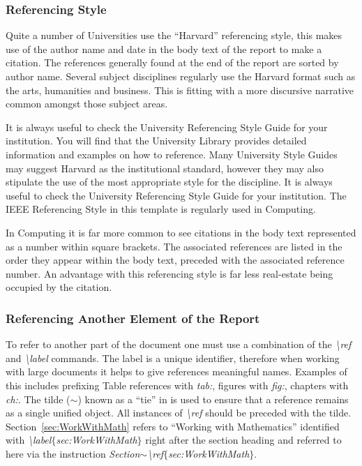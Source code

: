 \subsubsection{Referencing Style}
Quite a number of Universities use the ``Harvard'' referencing style, this makes use of the author name and date in the body text of the report to make a citation. The references generally found at the end of the report are sorted by author name. Several subject disciplines regularly use the Harvard format such as the arts, humanities and business. This is fitting with a more discursive narrative common amongst those subject areas. 

It is always useful to check the University Referencing Style Guide for your institution. You will find that the University Library provides detailed information and examples on how to reference. Many University Style Guides may suggest Harvard as the institutional standard, however they may also stipulate the use of the most appropriate style for the discipline. It is always useful to check the University Referencing Style Guide for your institution. The IEEE Referencing Style in this template is regularly used in Computing.      

In Computing it is far more common to see citations in the body text represented as a number within square brackets. The associated references are listed in the order they appear within the body text, preceded with the associated reference number. An advantage with this referencing style is far less real-estate being occupied by the citation. 

\subsubsection{Referencing Another Element of the Report}
To refer to another part of the document one must use a combination of the \emph{\textbackslash ref} and \emph{\textbackslash label} commands. The label is a unique identifier, therefore when working with large documents it helps to give references meaningful names. Examples of this includes prefixing Table references with \emph{tab:}, figures with \emph{fig:}, chapters with \emph{ch:}. The tilde ($\sim$) known as a ``tie'' in \latex is used to ensure that a reference remains as a single unified object. All instances of \emph{\textbackslash ref} should be preceded with the tilde. Section~\ref{sec:WorkWithMath} refers to ``Working with Mathematics'' identified with \emph{\textbackslash label$\{$sec:WorkWithMath$\}$} right after the section heading and referred to here via the instruction \emph{Section$\sim$\textbackslash ref$\{$sec:WorkWithMath$\}$}. 

